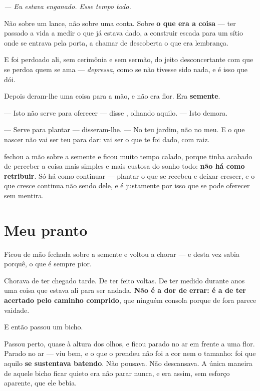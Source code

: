 \documentclass[livro.tex]{subfiles}
\begin{document}
\begin{center}
\emph{--- Eu estava enganado. Esse tempo todo.}
\end{center}

\medskip
\noindent Não sobre um lance, não sobre uma conta. Sobre \textbf{o que era a
coisa} --- ter passado a vida a medir o que já estava dado, a construir escada
para um sítio onde se entrava pela porta, a chamar de descoberta o que era
lembrança.

\medskip
\noindent E foi perdoado ali, sem cerimônia e sem sermão, do jeito
desconcertante com que se perdoa quem se ama --- \emph{depressa}, como se não
tivesse sido nada, e é isso que dói.

\medskip
\noindent Depois deram-lhe uma coisa para a mão, e não era flor. Era
\textbf{semente}.

--- Isto não serve para oferecer --- disse \Ben , olhando aquilo. --- Isto
demora.

--- Serve para plantar --- disseram-lhe. --- No teu jardim, não no meu. E o
que nascer não vai ser teu para dar: vai ser o que te foi dado, com raiz.

\medskip
\noindent \Ben fechou a mão sobre a semente e ficou muito tempo calado, porque
tinha acabado de perceber a coisa mais simples e mais custosa do sonho todo:
\textbf{não há como retribuir}. Só há como continuar --- plantar o que se
recebeu e deixar crescer, e o que cresce continua não sendo dele, e é
justamente por isso que se pode oferecer sem mentira.

\chapter{Meu pranto}

Ficou de mão fechada sobre a semente e voltou a chorar --- e desta vez sabia
porquê, o que é sempre pior.

Chorava de ter chegado tarde. De ter feito voltas. De ter medido durante anos
uma coisa que estava ali para ser andada. \textbf{Não é a dor de errar: é a de
ter acertado pelo caminho comprido}, que ninguém consola porque de fora parece
vaidade.

\medskip
\noindent E então passou um bicho.

Passou perto, quase à altura dos olhos, e ficou parado no ar em frente a uma
flor. Parado no ar --- \Ben viu bem, e o que o prendeu não foi a cor nem o
tamanho: foi que aquilo \textbf{se sustentava batendo}. Não pousava. Não
descansava. A única maneira de aquele bicho ficar quieto era não parar nunca, e
era assim, sem esforço aparente, que ele bebia.
\end{document}
